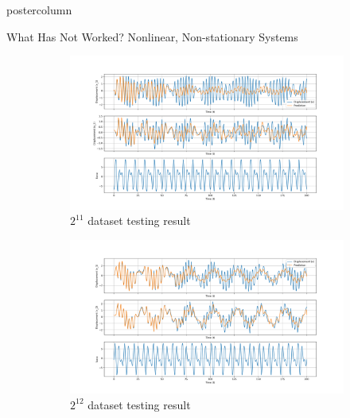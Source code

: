 \documentclass[mathserif]{beamer}
\begin{document}
\begin{frame}
\begin{columns}
\begin{beamercolorbox}[center,wd=\textwidth]{postercolumn}
\begin{minipage}[T]{.95\linewidth}
{\begin{block}{What Has Not Worked? Nonlinear, Non-stationary Systems}
\begin{figure}
     \centering
     \begin{subfigure}[b]{0.24\linewidth}
         \centering
         \includegraphics[width=1\linewidth]{figures/2048_sobol_2dof_nlinear_tfno.png}
         \caption{$2^{11}$ dataset testing result}
         \label{fig:y equals x}
     \end{subfigure}
     \hfill
     \begin{subfigure}[b]{0.24\linewidth}
         \centering
         \includegraphics[width=1\linewidth]{figures/4096_sobol_2dof_nlinear_tfno.png}
         \caption{$2^{12}$ dataset testing result}
         \label{fig:three sin x}
     \end{subfigure}
     \hfill
     \begin{subfigure}[b]{0.24\linewidth}
         \centering

\end{subfigure}
\end{figure}
\end{block}}
\end{minipage}
\end{beamercolorbox}
\end{columns}
\end{frame}
\end{document}

